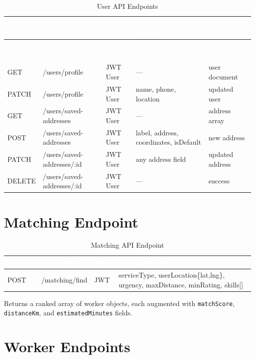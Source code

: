 \documentclass[12pt,a4paper]{report}
\newcommand{\thead}[1]{\cellcolor{tableheader}\textcolor{white}{\textbf{#1}}}
\begin{document}
\begin{longtable}{|p{1cm}|p{3cm}|p{1.5cm}|p{4cm}|p{3cm}|}
\caption{User API Endpoints}\label{tab:userapi}\\
\hline
\thead{Method} & \thead{Endpoint} & \thead{Auth} & \thead{Request Body / Query} & \thead{Response} \\
\hline
\endfirsthead
\hline
\thead{Method} & \thead{Endpoint} & \thead{Auth} & \thead{Request Body / Query} & \thead{Response} \\
\hline
\endhead
GET & /users/profile & JWT User & — & user document \\
\hline
PATCH & /users/profile & JWT User & name, phone, location & updated user \\
\hline
GET & /users/saved-addresses & JWT User & — & address array \\
\hline
POST & /users/saved-addresses & JWT User & label, address, coordinates, isDefault & new address \\
\hline
PATCH & /users/saved-addresses/:id & JWT User & any address field & updated address \\
\hline
DELETE & /users/saved-addresses/:id & JWT User & — & success \\
\hline
\end{longtable}

\section{Matching Endpoint}

\begin{table}[h!]
\centering
\caption{Matching API Endpoint}
\renewcommand{\arraystretch}{1.3}
\begin{tabular}{|p{1.5cm}|p{3cm}|p{1.5cm}|p{6cm}|}
\hline
\thead{Method} & \thead{Endpoint} & \thead{Auth} & \thead{Request Body} \\
\hline
POST & /matching/find & JWT & serviceType, userLocation\{lat,lng\}, urgency, maxDistance, minRating, skills[] \\
\hline
\end{tabular}
\end{table}

Returns a ranked array of worker objects, each augmented with \texttt{matchScore}, \texttt{distanceKm}, and \texttt{estimatedMinutes} fields.

\section{Worker Endpoints}
\end{document}
